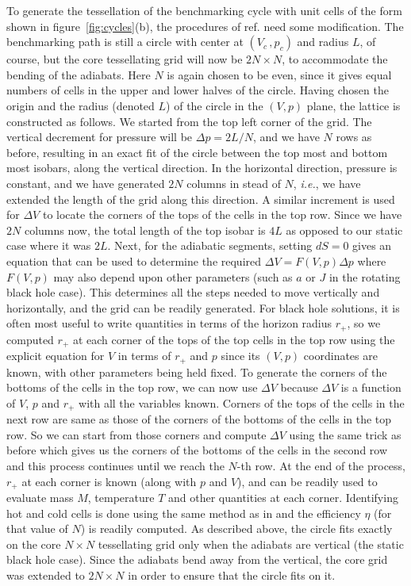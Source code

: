 \documentclass[letterpaper,11pt]{article}
\begin{document}
To generate the tessellation of the benchmarking cycle with unit cells of the form shown in figure~\ref{fig:cycles}(b), the procedures of ref.\cite{Chakraborty:2016ssb} need some modification. The benchmarking path is still a circle with center at $(V_c\,,p_c)$ and radius $L$, of course, but the core tessellating grid will now be $2N\times N$, to accommodate the bending of the adiabats. Here $N$ is again chosen to be even, since it gives equal numbers of cells in the upper and lower halves of the circle. Having chosen the origin and the radius (denoted $L$) of the circle in the $(V,p)$ plane, the lattice is constructed as follows. We started from the top left corner of the grid. The vertical decrement for pressure will be $\Delta p=2L/N$, and we have $N$ rows as before, resulting in an exact fit of the circle between the top most and bottom most isobars, along the vertical direction. In the horizontal direction, pressure is constant, and we have generated $2N$ columns in stead of $N$, {\it i.e.}, we have extended the length of the grid along this direction. A similar increment is used for $\Delta V$ to locate the corners of the tops of the cells in the top row. Since we have $2N$ columns now, the total length of the top isobar is $4L$ as opposed to our static case where it was $2L$. Next, for the adiabatic segments, setting $dS=0$ gives an equation that can be used to determine the required $\Delta V=F(V,p)\Delta p$ where $F(V,p)$ may also depend upon other parameters (such as $a$ or $J$ in the rotating black hole case). This determines all the steps needed to move vertically and horizontally, and the grid can be readily generated. For black hole solutions, it is often most useful to write quantities in terms of the horizon radius $r_{+}$, so we computed $r_{+}$ at each corner of the tops of the top cells in the top row using the explicit equation for $V$ in terms of $r_{+}$ and $p$ since its $(V,p)$ coordinates are known, with other parameters being held fixed. To generate the corners of the bottoms of the cells in the top row, we can now use $\Delta V$ because $\Delta V$ is a function of $V$, $p$ and $r_{+}$ with all the variables known. Corners of the tops of the cells in the next row are same as those of the corners of the bottoms of the cells in the top row. So we can start from those corners and compute $\Delta V$ using the same trick as before which gives us the corners of the bottoms of the cells in the second row and this process continues until we reach the $N$-th row. At the end of the process, $r_{+}$ at each corner is known (along with $p$ and $V$), and can be readily used to evaluate mass $M$, temperature $T$ and other quantities at each corner. Identifying hot and cold cells is done using the same method as in \cite{Chakraborty:2016ssb} and the efficiency $\eta$ (for that value of $N$) is readily computed. As described above, the circle fits exactly on the core $N\times N$ tessellating grid only when the adiabats are vertical (the static black hole case). Since the adiabats bend away from the vertical, the core grid was extended to $2N\times N$ in order to ensure that the circle fits on it.  
\end{document}
